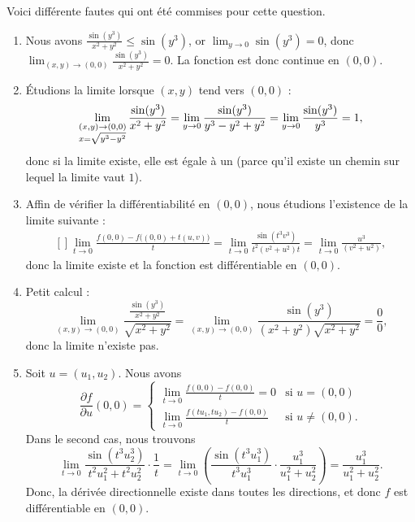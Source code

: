 Voici différente fautes qui ont été commises pour cette question.
\begin{enumerate}

\item
Nous avons $\frac{ \sin(y^3) }{ x^2+y^2 }\leq\sin(y^3)$, or $\lim_{y\to 0}\sin(y^3)=0$, donc $\lim_{(x,y)\to(0,0)}\frac{ \sin(y^3) }{ x^2+y^2 }=0 $. La fonction est donc continue en $(0,0)$.

\item
Étudions la limite lorsque $(x,y)$ tend vers $(0,0)$ :
\begin{equation}
	\begin{aligned}[]
		\lim_{ \begin{subarray}{l} (x,y)\to(0,0)\\x=\sqrt{y^3-y^2} \end{subarray} }\frac{ \sin(y^3) }{ x^2+y^2 }=\lim_{y\to 0} \frac{ \sin(y^3) }{ y^3-y^2+y^2 }=\lim_{y\to 0} \frac{ \sin(y^3) }{ y^3 }=1,
	\end{aligned}
\end{equation}
donc si la limite existe, elle est égale à un (parce qu'il existe un chemin sur lequel la limite vaut $1$).

\item
Affin de vérifier la différentiabilité en $(0,0)$, nous étudions l'existence de la limite suivante :
\begin{equation}
	\begin{aligned}[]
		\lim_{t\to 0} \frac{ f(0,0)-f\big( (0,0)+t(u,v) \big) }{ t }=\lim_{t\to 0} \frac{ \sin(t^3v^3) }{ t^2(v^2+u^2)t }=\lim_{t\to 0} \frac{ u^3 }{ (v^2+u^2) },
	\end{aligned}
\end{equation}
donc la limite existe et la fonction est différentiable en $(0,0)$.

\item
Petit calcul :
\begin{equation}
	\lim_{(x,y)\to (0,0)} \frac{ \frac{ \sin(y^3) }{ x^2+y^2 } }{ \sqrt{x^2+y^2} }=\lim_{(x,y)\to (0,0)} \frac{ \sin(y^3) }{ (x^2+y^2)\sqrt{x^2+y^2} }=\frac{ 0 }{ 0 },
\end{equation}
donc la limite n'existe pas.

\item
Soit $u=(u_1,u_2)$. Nous avons
\begin{equation}
	\frac{ \partial f }{ \partial u }(0,0)=
	\begin{cases}
	\lim_{t\to 0} \frac{ f(0,0)-f(0,0) }{ t }=0	&	\text{si $u=(0,0)$}\\
	\lim_{t\to 0} \frac{ f(tu_1,tu_2)-f(0,0) }{ t }	&	 \text{si $u\neq(0,0)$.}
\end{cases}
\end{equation}
Dans le second cas, nous trouvons
\begin{equation}
	\lim_{t\to 0} \frac{ \sin(t^3u_2^3) }{ t^2u_1^2+t^2u_2^2 }\cdot\frac{1}{ t }=\lim_{t\to 0} \left( \frac{ \sin(t^3u_1^3) }{ t^3u_1^3 }\cdot\frac{ u_1^3 }{ u_1^2+u_2^2 } \right)=\frac{ u_1^3 }{ u_1^2+u_2^2 }.
\end{equation}
Donc, la dérivée directionnelle existe dans toutes les directions, et donc $f$ est différentiable en $(0,0)$.


    \end{enumerate}
